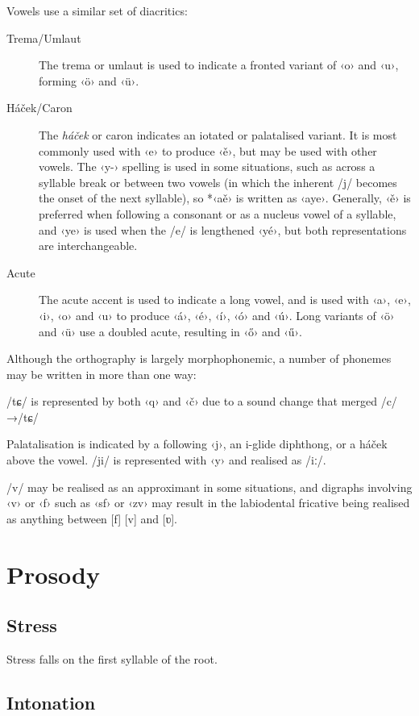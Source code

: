 \documentclass[grammar]{subfiles}
\begin{document}
	\pagebreak[2]
	Vowels use a similar set of diacritics:

	\begin{description}
		\item[Trema/Umlaut] The trema or umlaut is used to indicate a fronted variant of ‹o› and ‹u›, forming ‹ö› and ‹ü›.
		\item[Háček/Caron]\label{def:hacek} The \emph{háček} or caron indicates an iotated or palatalised variant. It is most commonly used with ‹e› to produce ‹ě›, but may be used with other vowels. The ‹y-› spelling is used in some situations, such as across a syllable break or between two vowels (in which the inherent /j/ becomes the onset of the next syllable), so *‹aě› is written as ‹aye›. Generally, ‹ě› is preferred when following a consonant or as a nucleus vowel of a syllable, and ‹ye› is used when the /e/ is lengthened ‹yé›, but both representations are interchangeable.
		\item[Acute] The acute accent is used to indicate a long vowel, and is used with ‹a›, ‹e›, ‹i›, ‹o› and ‹u› to produce ‹á›, ‹é›, ‹í›, ‹ó› and ‹ú›. Long variants of ‹ö› and ‹ü› use a doubled acute, resulting in ‹ő› and ‹ű›. 
	\end{description}

	Although the orthography is largely morphophonemic, a number of phonemes may be written in more than one way:

	\begin{itemize*}
	\item	/tɕ/ is represented by both ‹q› and ‹č› due to a sound change that merged /c/→/tɕ/
	\item Palatalisation is indicated by a following ‹j›, an i-glide diphthong, or a háček above the vowel. /ji/ is represented with ‹y› and realised as /\superj iː/.
	\item /v/ may be realised as an approximant in some situations, and digraphs involving ‹v› or ‹f› such as ‹sf› or ‹zv› may result in the labiodental fricative being realised as anything between [f] [v] and [ʋ].
	\end{itemize*}

	\section{Prosody}
	\label{sec:prosody}

	\ToBeWritten

	\subsection{Stress}
	\label{ssec:stress}

	Stress falls on the first syllable of the root. \ToBeWritten

	\subsection{Intonation}
	\label{ssec:intonation}

	\ToBeWritten
\end{document}
